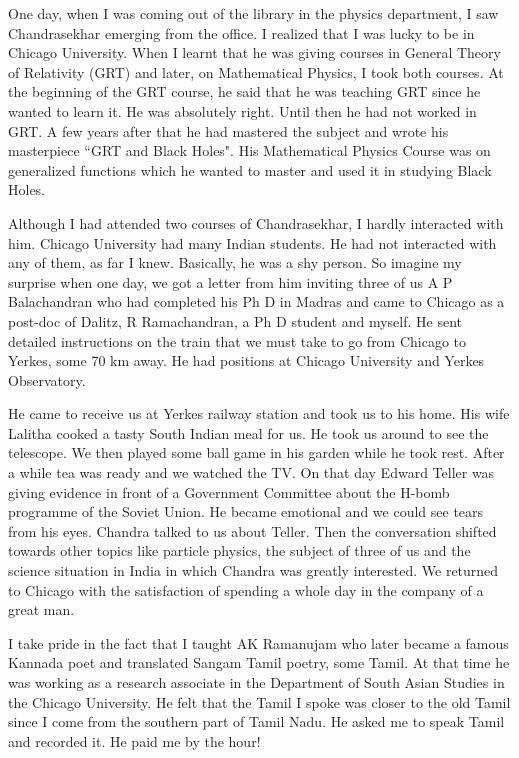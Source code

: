 One day, when I was coming out of the library in the physics department, 
I saw Chandrasekhar emerging from the office. I realized that I was 
lucky to be in Chicago University. When I learnt that he was giving 
courses in General Theory of Relativity (GRT) and later, on Mathematical 
Physics, I took both courses. At the beginning of the GRT course, he 
said that he was teaching GRT since he wanted to learn it. He was 
absolutely right. Until then he had not worked in GRT. A few years after 
that he had mastered the subject and wrote his masterpiece ``GRT and 
Black Holes". His Mathematical Physics Course was on generalized 
functions which he wanted to master and used it in studying Black Holes.

Although I had attended two courses of Chandrasekhar, I hardly 
interacted with him. Chicago University had many Indian students. He had 
not interacted with any of them, as far I knew. Basically, he was a shy 
person. So imagine my surprise when one day, we got a letter from him 
inviting three of us A P Balachandran who had completed his Ph D in 
Madras and came to Chicago as a post-doc of Dalitz, R Ramachandran, a Ph 
D student and myself. He sent detailed instructions on the train that we 
must take to go from Chicago to Yerkes, some 70 km away. He had 
positions at Chicago University and Yerkes Observatory.

He came to receive us at Yerkes railway station and took us to his home. 
His wife Lalitha cooked a tasty South Indian meal for us. He took us 
around to see the telescope. We then played some ball game in his garden 
while he took rest. After a while tea was ready and we watched the TV. 
On that day Edward Teller was giving evidence in front of a Government 
Committee about the H-bomb programme of the Soviet Union. He became 
emotional and we could see tears from his eyes. Chandra talked to us 
about Teller. Then the conversation shifted towards other topics like 
particle physics, the subject of three of us and the science situation 
in India in which Chandra was greatly interested. We returned to Chicago 
with the satisfaction of spending a whole day in the company of a great 
man.
\smallskip
  
I take pride in the fact that I taught AK Ramanujam who later became
a famous Kannada poet and translated Sangam Tamil poetry, some Tamil.
At that time he was working as a research associate in the Department
of South Asian Studies in the Chicago University. He felt that the
Tamil I spoke was closer to the old Tamil since I come from the
southern part of Tamil Nadu. He asked me to speak Tamil and recorded it.
He paid me by the hour!
\smallskip

